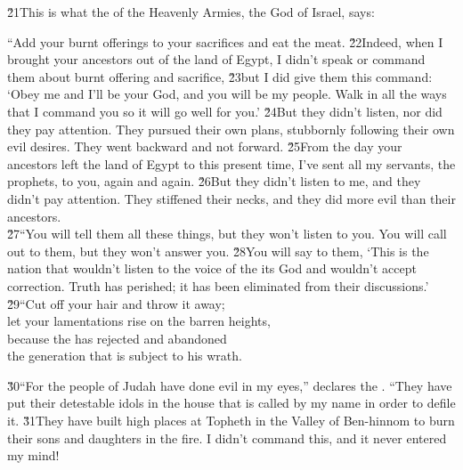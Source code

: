 \v{21}This is what the  of the Heavenly Armies, the God of Israel, says:

\begin{poetry}
\poeml ``Add your burnt offerings to your sacrifices and eat the meat. \v{22}Indeed, when I brought your ancestors out of the land of Egypt, I didn't speak or command them about burnt offering and sacrifice, \v{23}but I did give them this command: `Obey me and I'll be your God, and you will be my people. Walk in all the ways that I command you so it will go well for you.' \v{24}But they didn't listen, nor did they pay attention. They pursued their own plans, stubbornly following their own evil desires. They went backward and not forward. \v{25}From the day your ancestors left the land of Egypt to this present time, I've sent all my servants, the prophets, to you, again and again. \v{26}But they didn't listen to me, and they didn't pay attention. They stiffened their necks, and they did more evil than their ancestors. \\
\poeml \v{27}``You will tell them all these things, but they won't listen to you. You will call out to them, but they won't answer you. \v{28}You will say to them, `This is the nation that wouldn't listen to the voice of the  its God and wouldn't accept correction. Truth has perished; it has been eliminated from their discussions.' \\
\poeml \v{29}``Cut off your hair and throw it away; \\
\poemll    let your lamentations rise on the barren heights, \\
\poeml because the  has rejected and abandoned \\
\poemll    the generation that is subject to his wrath.
\end{poetry}

\begin{poetry}
\poeml \v{30}``For the people of Judah have done evil in my eyes,'' declares the . ``They have put their detestable idols in the house that is called by my name in order to defile it. \v{31}They have built high places at Topheth in the Valley of Ben-hinnom to burn their sons and daughters in the fire. I didn't command this, and it never entered my mind!
\end{poetry}

